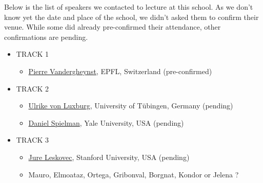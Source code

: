 \documentclass[a4paper]{scrartcl}
\begin{document}
Below is the list of speakers we contacted to lecture at this school. As we
don't know yet the date and place of the school, we didn't asked them to confirm
their venue. While some did already pre-confirmed their attendance, other
confirmations are pending.
\begin{itemize}
\setlength{\itemsep}{0pt} \setlength{\parskip}{0pt}
\item TRACK 1
	\begin{itemize}
	\setlength{\itemsep}{0pt} \setlength{\parskip}{0pt}
	\item \href{http://people.epfl.ch/pierre.vandergheynst}
		{Pierre Vandergheynst}, EPFL, Switzerland
		(pre-confirmed)
	\end{itemize}
\item TRACK 2
	\begin{itemize}
	\setlength{\itemsep}{0pt} \setlength{\parskip}{0pt}
	\item \href{http://www.wsi.uni-tuebingen.de/lehrstuehle/theory-of-machine-learning/people/ulrike-von-luxburg.htmli}
		{Ulrike von Luxburg}, University of Tübingen, Germany
		(pending)
	\item \href{http://www.cs.yale.edu/homes/spielman/}
		{Daniel Spielman}, Yale University, USA
		(pending)
	\end{itemize}
\item TRACK 3
	\begin{itemize}
	\setlength{\itemsep}{0pt} \setlength{\parskip}{0pt}
	\item \href{http://cs.stanford.edu/people/jure/}
		{Jure Leskovec}, Stanford University, USA
		(pending)
	\item Mauro, Elmoataz, Ortega, Gribonval, Borgnat, Kondor or Jelena ?
	\end{itemize}
\end{itemize}
\end{document}

